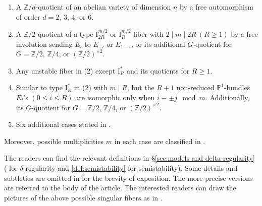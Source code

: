 \documentclass[reqno, letterpaper]{amsart}
\numberwithin{equation}{subsection}
\newcommand{\PP}{\mathbb{P}}
\newcommand{\ZZ}{\mathbb{Z}}
\begin{document}
\begin{theorem}
\begin{enumerate}
\begin{enumerate}
				\item[\textnormal{($\mathrm I_0^+$)}] A $\ZZ/d$-quotient of an abelian variety of dimension $n$ by a free automorphism of order $d = 2$, $3$, $4$, or $6$.
				\item[\textnormal{($\mathrm I_R^\pm$)}] A $\ZZ/2$-quotient of a type $\mathrm I_{2R}^{m/2}$ or $\mathrm I_R^{m/2}$ fiber with $2 \mid m \mid 2R \ (R \ge 1)$ by a free involution sending $E_i$ to $E_{-i}$ or $E_{1-i}$, or its additional $G$-quotient for $G = \ZZ/2$, $\ZZ/4$, or $(\ZZ/2)^{\times 2}$.
				
				\item[\textnormal{($\mathrm{II}$, $\cdots$)}] Any unstable fiber in (2) except $\mathrm I_R^*$ and its quotients for $R \ge 1$.
				\item[\textnormal{($\mathrm I_R^*$)}] Similar to type $\mathrm I_R^*$ in (2) with $m \mid R$, but the $R+1$ non-reduced $\PP^1$-bundles $E_i$'s $(0 \le i \le R)$ are isomorphic only when $i \equiv \pm j \mod m$. Additionally, its $G$-quotient for $G = \ZZ/2$, $\ZZ/4$, or $(\ZZ/2)^{\times 2}$.
				\item[\textnormal{($\mathrm I_0^*$-a, $\cdots$)}] Six additional cases stated in .
			\end{enumerate}
			Moreover, possible multiplicities $m$ in each case are classified in .
		\end{enumerate}
	\end{theorem}
	
	The readers can find the relevant definitions in \S \ref{sec:models and delta-regularity} ( for $\delta$-regularity and \ref{def:semistability} for semistability). Some details and subtleties are omitted in  for the brevity of exposition. The more precise versions are referred to the body of the article. The interested readers can draw the pictures of the above possible singular fibers as in \cite[Figures~1--3]{mat01}.
	
\end{document}
